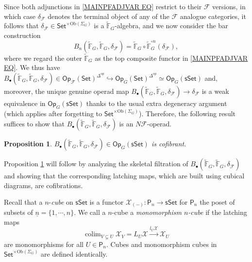 \documentclass[a4paper,10pt
,draft
]{article}%
\numberwithin{equation}{section}
\numberwithin{figure}{section}
\newtheorem{proposition}[equation]{Proposition}%
\theoremstyle{definition} %
\DeclareMathOperator{\colim}{colim}%
\newcommand{\1}{\ensuremath{\mathbbm 1}}%
\begin{document}
Since both adjunctions in 
\eqref{MAINPFADJVAR EQ}
restrict to their $\mathcal{F}$ versions,
in which case $\delta_{\mathcal{F}}$ denotes the terminal object of any of the $\mathcal{F}$ analogue categories,
it follows that 
$\delta_{\mathcal{F}} \in \mathsf{Set}^{\times \text{Ob}(\Sigma_G)}$
is a 
$\widetilde{\mathbb{F}}_G$-algebra, 
and we now consider the bar construction
\[B_n(\widetilde{\mathbb{F}}_G,
\widetilde{\mathbb{F}}_G,
\delta_{\mathcal{F}})
= \widetilde{\mathbb{F}}_G \circ
\widetilde{\mathbb{F}}_G ^{\circ n} 
(\delta_{\mathcal{F}}),
\]
where we regard the outer $\widetilde{\mathbb{F}}_G$ as the top composite functor in \eqref{MAINPFADJVAR EQ}.
We thus have
$B_{\bullet}(\widetilde{\mathbb{F}}_G,
\widetilde{\mathbb{F}}_G,
\delta_{\mathcal{F}})
\in
\mathsf{Op}_{\mathcal{F}}(\mathsf{Set})^{\Delta^{op}}
	\hookrightarrow
\mathsf{Op}_G(\mathsf{Set})^{\Delta^{op}}
\simeq \mathsf{Op}_G(\mathsf{sSet})$
and, moreover, the unique genuine operad map
$B_{\bullet}(\widetilde{\mathbb{F}}_G,
\widetilde{\mathbb{F}}_G,
\delta_{\mathcal{F}})
\to 
\delta_{\mathcal{F}}$
is a weak equivalence in 
$\mathsf{Op}_G(\mathsf{sSet})$
thanks to the usual extra degeneracy argument
\cite[\S 4.5]{Ri14}
(which applies after forgetting to 
$\mathsf{Set}^{\times \text{Ob}(\Sigma_G)}$).
Therefore, 
the following result suffices to show that
$B_{\bullet}(\widetilde{\mathbb{F}}_G,
\widetilde{\mathbb{F}}_G,
\delta_{\mathcal{F}})
$
is an $N \mathcal{F}$-operad.

\begin{proposition}\label{BARCOF PROP}
$B_{\bullet}(\widetilde{\mathbb{F}}_G,
\widetilde{\mathbb{F}}_G,
\delta_{\mathcal{F}})
\in \mathsf{Op}_G(\mathsf{sSet})
$
is cofibrant.
\end{proposition}

Proposition \ref{BARCOF PROP}
will follow by analyzing the skeletal filtration of
$B_{\bullet}(\widetilde{\mathbb{F}}_G,
\widetilde{\mathbb{F}}_G,
\delta_{\mathcal{F}})
$ and showing that the corresponding latching maps,
which are built using cubical diagrams, are cofibrations.

Recall that a $n$-\textit{cube} on $\mathsf{sSet}$
is a functor
$\mathcal{X}_{(\minus)} \colon \mathsf{P}_n \to 
\mathsf{sSet}$
for $\mathsf{P}_n$ the poset of subsets of 
$\underline{n} = \{1,\cdots,n\}$.
We call a $n$-cube a \textit{monomorphism $n$-cube}
if the latching maps
\[
\colim_{V \subsetneq U} \mathcal{X}_V = L_U \mathcal{X}
\xrightarrow{l_U \mathcal{X}} 
\mathcal{X}_U
\]
are monomorphisms for all $U \in \mathsf{P}_n$.
Cubes and monomorphism cubes in
$\mathsf{Set}^{\times \text{Ob}(\Sigma_G)}$
are defined identically.
\end{document}
